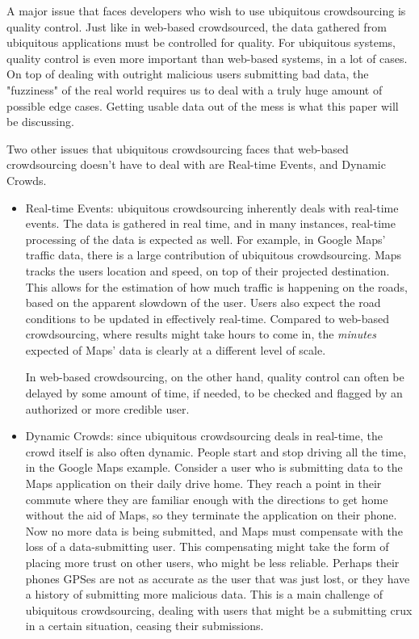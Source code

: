\documentclass{sig-alternate-05-2015}
\begin{document}
	A major issue that faces developers who wish to use ubiquitous crowdsourcing is quality control. Just like in web-based crowdsourced, the data gathered from ubiquitous applications must be controlled for quality. For ubiquitous systems, quality control is even more important than web-based systems, in a lot of cases. On top of dealing with outright malicious users submitting bad data, the "fuzziness" of the real world requires us to deal with a truly huge amount of possible edge cases. Getting usable data out of the mess is what this paper will be discussing.

	Two other issues that ubiquitous crowdsourcing faces that web-based crowdsourcing doesn't have to deal with are Real-time Events, and Dynamic Crowds.
	\begin{itemize}
		\item Real-time Events: ubiquitous crowdsourcing inherently deals with real-time events. The data is gathered in real time, and in many instances, real-time processing of the data is expected as well. For example, in Google Maps' traffic data, there is a large contribution of ubiquitous crowdsourcing. Maps tracks the users location and speed, on top of their projected destination. This allows for the estimation of how much traffic is happening on the roads, based on the apparent slowdown of the user. Users also expect the road conditions to be updated in effectively real-time. Compared to web-based crowdsourcing, where results might take hours to come in, the \emph{minutes} expected of Maps' data is clearly at a different level of scale.
		
		In web-based crowdsourcing, on the other hand, quality control can often be delayed by some amount of time, if needed, to be checked and flagged by an authorized or more credible user. 
		
		\item Dynamic Crowds: since ubiquitous crowdsourcing deals in real-time, the crowd itself is also often dynamic. People start and stop driving all the time, in the Google Maps example. Consider a user who is submitting data to the Maps application on their daily drive home. They reach a point in their commute where they are familiar enough with the directions to get home without the aid of Maps, so they terminate the application on their phone. Now no more data is being submitted, and Maps must compensate with the loss of a data-submitting user. This compensating might take the form of placing more trust on other users, who might be less reliable. Perhaps their phones GPSes are not as accurate as the user that was just lost, or they have a history of submitting more malicious data. This is a main challenge of ubiquitous crowdsourcing, dealing with users that might be a submitting crux in a certain situation, ceasing their submissions.
		

\end{itemize}
\end{document}
